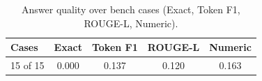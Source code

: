 \begin{table}[h]
  \centering
  \caption{Answer quality over bench cases (Exact, Token F1, ROUGE-L, Numeric).}
  \begin{tabular}{lcccc}
    \toprule
    Cases & Exact & Token F1 & ROUGE-L & Numeric \\ \midrule
    15 of 15 & 0.000 & 0.137 & 0.120 & 0.163 \\
    \bottomrule
  \end{tabular}
\end{table}
